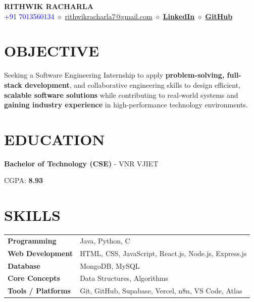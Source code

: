 \documentclass[letterpaper,11pt]{article}
\begin{document}
\begin{center}

{\Huge \textbf{RITHWIK RACHARLA}} \\[6pt]

\textcolor{blue}{+91 7013560134} \quad $\diamond$ \quad
\textcolor{blue}{\href{mailto:rithwikracharla7@gmail.com}{rithwikracharla7@gmail.com}} \quad $\diamond$ \quad
\textcolor{blue}{\href{https://www.linkedin.com/in/rithwik-racharla-488064211}{\textbf{LinkedIn}}} \quad $\diamond$ \quad
\textcolor{blue}{\href{https://github.com/Rithwik007}{\textbf{GitHub}}}

\end{center}

\section*{OBJECTIVE}

Seeking a Software Engineering Internship to apply \textbf{problem-solving, full-stack development}, and collaborative engineering skills to design efficient, \textbf{scalable software solutions} while contributing to real-world systems and \textbf{gaining industry experience} in high-performance technology environments.

\section*{EDUCATION}

\textbf{Bachelor of Technology (CSE)} - VNR VJIET

CGPA: \textbf{8.93}

\section*{SKILLS}

\begin{tabularx}{\textwidth}{l X}

\textbf{Programming} & Java, Python, C \\

\textbf{Web Development} & HTML, CSS, JavaScript, React.js, Node.js, Express.js \\

\textbf{Database} & MongoDB, MySQL \\

\textbf{Core Concepts} & Data Structures, Algorithms \\

\textbf{Tools / Platforms} & Git, GitHub, Supabase, Vercel, n8n, VS Code, Atlas \\

\end{tabularx}
\end{document}
